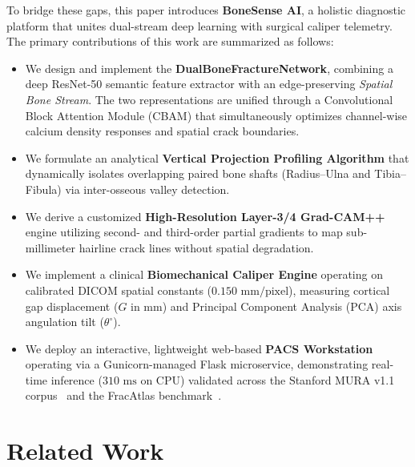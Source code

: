 \documentclass[journal]{IEEEtran}
\begin{document}
To bridge these gaps, this paper introduces \textbf{BoneSense AI\texttrademark}, a holistic diagnostic platform that unites dual-stream deep learning with surgical caliper telemetry. The primary contributions of this work are summarized as follows:
\begin{itemize}
    \item We design and implement the \textbf{DualBoneFractureNetwork}, combining a deep ResNet-50 semantic feature extractor with an edge-preserving \textit{Spatial Bone Stream}. The two representations are unified through a Convolutional Block Attention Module (CBAM) that simultaneously optimizes channel-wise calcium density responses and spatial crack boundaries.
    \item We formulate an analytical \textbf{Vertical Projection Profiling Algorithm} that dynamically isolates overlapping paired bone shafts (Radius--Ulna and Tibia--Fibula) via inter-osseous valley detection.
    \item We derive a customized \textbf{High-Resolution Layer-3/4 Grad-CAM++} engine utilizing second- and third-order partial gradients to map sub-millimeter hairline crack lines without spatial degradation.
    \item We implement a clinical \textbf{Biomechanical Caliper Engine} operating on calibrated DICOM spatial constants ($0.150\text{ mm/pixel}$), measuring cortical gap displacement ($G\text{ in mm}$) and Principal Component Analysis (PCA) axis angulation tilt ($\theta^\circ$).
    \item We deploy an interactive, lightweight web-based \textbf{PACS Workstation} operating via a Gunicorn-managed Flask microservice, demonstrating real-time inference ($310\text{ ms}$ on CPU) validated across the Stanford MURA v1.1 corpus~\cite{rajpurkar2017mura} and the FracAtlas benchmark~\cite{fracatlas2023}.
\end{itemize}

\section{Related Work}
\end{document}
